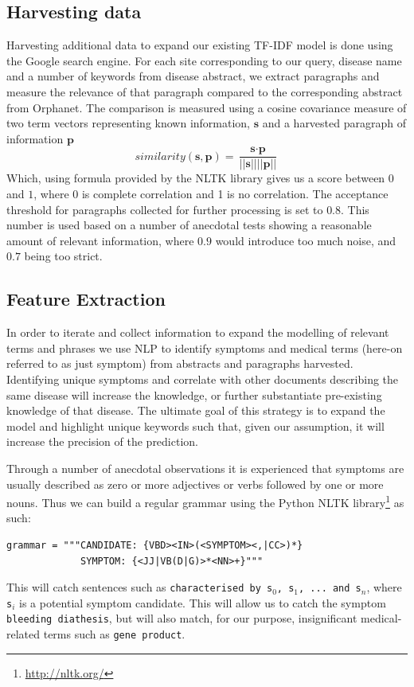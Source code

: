 \documentclass[10pt,letterpaper,final]{article}
\begin{document}
\subsection{Harvesting data}
Harvesting additional data to expand our existing TF-IDF model is done
using the Google search engine. For each site corresponding to our
query, disease name and a number of keywords from disease abstract, we
extract paragraphs and measure the relevance of that paragraph compared
to the corresponding abstract from Orphanet. The comparison is measured
using a cosine covariance measure of two term vectors representing
known information, $\textbf{s}$ and a harvested paragraph of information
$\textbf{p}$
\[
similarity(\textbf{s}, \textbf{p}) = \frac{\textbf{s} \cdot \textbf{p}}{||\textbf{s}|| ||\textbf{p}||}
\]
Which, using formula provided by the NLTK library gives us a score
between $0$ and $1$, where 0 is complete correlation and 1 is no
correlation. The acceptance threshold for paragraphs collected for
further processing is set to $0.8$. This number is used based on a
number of anecdotal tests showing a reasonable amount of relevant
information, where $0.9$ would introduce too much noise, and $0.7$
being too strict.



\subsection{Feature Extraction}
In order to iterate and collect information to expand the modelling of
relevant terms and phrases we use NLP to identify symptoms and medical
terms (here-on referred to as just symptom) from abstracts and
paragraphs harvested. Identifying unique symptoms and correlate with
other documents describing the same disease will increase the knowledge,
or further substantiate pre-existing knowledge of that disease. The
ultimate goal of this strategy is to expand the model and highlight
unique keywords such that, given our assumption, it will increase the
precision of the prediction.

Through a number of anecdotal observations it is experienced that
symptoms are usually described as zero or more adjectives or verbs
followed by one or more nouns. Thus we can build a regular grammar using the Python NLTK
library\footnote{\url{http://nltk.org/}} as such:
\begin{lstlisting}
grammar = """CANDIDATE: {VBD><IN>(<SYMPTOM><,|CC>)*}
             SYMPTOM: {<JJ|VB(D|G)>*<NN>+}"""
\end{lstlisting}
This will catch sentences such as \texttt{characterised by s$_{0}$,
s$_{1}$, ... and s$_{n}$}, where \texttt{s$_{i}$} is a potential symptom
candidate.
This will allow us to catch the symptom \texttt{bleeding diathesis}, but
will also match, for our purpose, insignificant medical-related terms
such as \texttt{gene product}.
\end{document}
